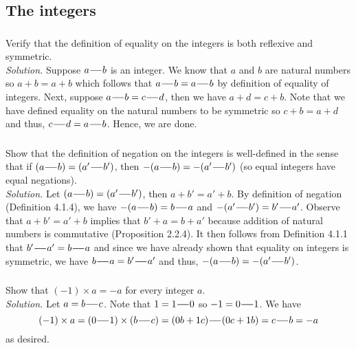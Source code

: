 \documentclass{amsart}
\theoremstyle{definition}
\newcommand{\soln}{\newline\textit{Solution.} }
\newcommand{\mns}{\hspace{-2pt}-\hspace{-4.1pt}-{}}
\begin{document}
\subsection{The integers} 

\subsubsection{}
Verify that the definition of equality on the integers is both reflexive and symmetric. \\
\soln Suppose $a\mns b$ is an integer. We know that $a$ and $b$ are natural numbers so $a+b=a+b$ which follows that $a\mns b=a\mns b$ by definition of equality of integers. Next, suppose $a\mns b=c\mns d$, then we have $a+d=c+b$. Note that we have defined equality on the natural numbers to be symmetric so $c+b=a+d$ and thus, $c\mns d=a\mns b$. Hence, we are done. \\
 
\subsubsection{} Show that the definition of negation on the integers is well-defined in the sense that if $(a\mns b)=(a'\mns b')$, then $-(a\mns b)=-(a'\mns b')$ (so equal integers have equal negations). \\
\soln Let $(a\mns b)=(a'\mns b')$, then $a+b'=a'+b$. By definition of negation (Definition 4.1.4), we have $-(a\mns b)=b\mns a$ and $-(a'\mns b')=b'\mns a'$. Observe that $a+b'=a'+b$ implies that $b'+a=b+a'$ because addition of natural numbers is commutative (Proposition 2.2.4). It then follows from Definition 4.1.1 that $b'\mns a'=b\mns a$ and since we have already shown that equality on integers is symmetric, we have $b\mns a=b'\mns a'$ and thus, $-(a\mns b)=-(a'\mns b')$. \\
 
\subsubsection{} Show that $(-1)\times a=-a$ for every integer $a$. \\
\soln Let $a=b\mns c$. Note that $1=1\mns0$ so $-1=0\mns 1$. We have 
\[
(-1)\times a=(0\mns 1)\times (b\mns c)=(0b+1c)\mns (0c+1b)=c\mns b=-a
\]
as desired. \\
 
\end{document}
